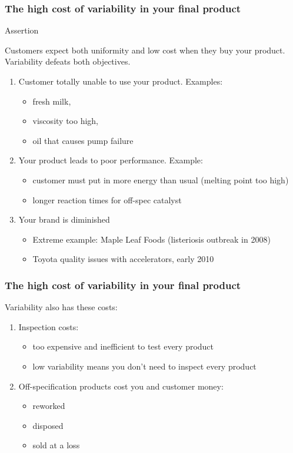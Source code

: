\begin{frame}\frametitle{The high cost of variability in your final product}
	\begin{block}
		{Assertion}
		\begin{center}
			Customers expect both uniformity and low cost when they buy your product. Variability defeats both objectives.
		\end{center}
	\end{block}
	\begin{enumerate}
		\item	Customer totally unable to use your product. Examples:
		\begin{itemize}
			\item	fresh milk,
			\item	viscosity too high,
			\item	oil that causes pump failure
		\end{itemize}
		\item	Your product leads to poor performance. Example:
		\begin{itemize}
			\item	customer must put in more energy than usual (melting point too high)
			\item	longer reaction times for off-spec catalyst
		\end{itemize}
		\item	Your brand is diminished
		\begin{itemize}
			\item	Extreme example: Maple Leaf Foods (listeriosis outbreak in 2008)
			\item	Toyota quality issues with accelerators, early 2010
		\end{itemize}
	\end{enumerate}
\end{frame}

\begin{frame}\frametitle{The high cost of variability in your final product}
	Variability also has these costs:
	\begin{enumerate}
		\item	Inspection costs:
		\begin{itemize}
			\item	too expensive and inefficient to test every product
			\item	low variability means you don't need to inspect every product
		\end{itemize}
		\item	Off-specification products cost you and customer money:
		\begin{itemize}
			\item	reworked
			\item	disposed
			\item	sold at a loss
		\end{itemize}
	\end{enumerate}
\end{frame}

